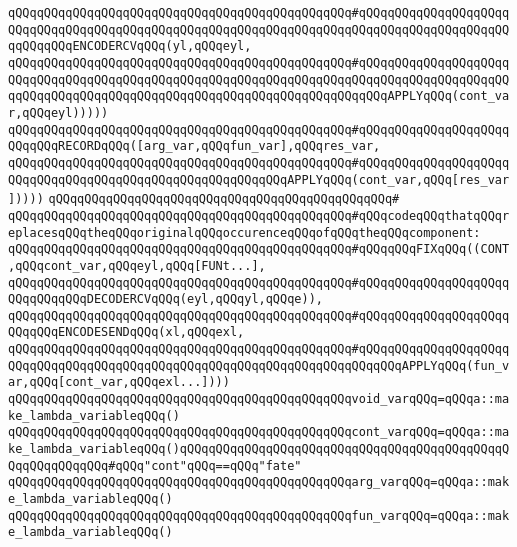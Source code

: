 \verb|qQQqqQQqqQQqqQQqqQQqqQQqqQQqqQQqqQQqqQQqqQQqqQQq#qQQqqQQqqQQqqQQqqQQqqQQqqQQqqQQqqQQqqQQqqQQqqQQqqQQqqQQqqQQqqQQqqQQqqQQqqQQqqQQqqQQqqQQqqQQqqQQqqQQqENCODERCVqQQq(yl,qQQqeyl,|\newline
\verb|qQQqqQQqqQQqqQQqqQQqqQQqqQQqqQQqqQQqqQQqqQQqqQQq#qQQqqQQqqQQqqQQqqQQqqQQqqQQqqQQqqQQqqQQqqQQqqQQqqQQqqQQqqQQqqQQqqQQqqQQqqQQqqQQqqQQqqQQqqQQqqQQqqQQqqQQqqQQqqQQqqQQqqQQqqQQqqQQqqQQqqQQqqQQqqQQqAPPLYqQQq(cont_var,qQQqeyl)))))|\newline
\verb|qQQqqQQqqQQqqQQqqQQqqQQqqQQqqQQqqQQqqQQqqQQqqQQq#qQQqqQQqqQQqqQQqqQQqqQQqqQQqRECORDqQQq([arg_var,qQQqfun_var],qQQqres_var,|\newline
\verb|qQQqqQQqqQQqqQQqqQQqqQQqqQQqqQQqqQQqqQQqqQQqqQQq#qQQqqQQqqQQqqQQqqQQqqQQqqQQqqQQqqQQqqQQqqQQqqQQqqQQqqQQqqQQqAPPLYqQQq(cont_var,qQQq[res_var]))))|\newline
\verb|qQQqqQQqqQQqqQQqqQQqqQQqqQQqqQQqqQQqqQQqqQQqqQQq#|\newline
\verb|qQQqqQQqqQQqqQQqqQQqqQQqqQQqqQQqqQQqqQQqqQQqqQQq#qQQqcodeqQQqthatqQQqreplacesqQQqtheqQQqoriginalqQQqoccurenceqQQqofqQQqtheqQQqcomponent:|\newline
\verb|qQQqqQQqqQQqqQQqqQQqqQQqqQQqqQQqqQQqqQQqqQQqqQQq#qQQqqQQqFIXqQQq((CONT,qQQqcont_var,qQQqeyl,qQQq[FUNt...],|\newline
\verb|qQQqqQQqqQQqqQQqqQQqqQQqqQQqqQQqqQQqqQQqqQQqqQQq#qQQqqQQqqQQqqQQqqQQqqQQqqQQqqQQqDECODERCVqQQq(eyl,qQQqyl,qQQqe)),|\newline
\verb|qQQqqQQqqQQqqQQqqQQqqQQqqQQqqQQqqQQqqQQqqQQqqQQq#qQQqqQQqqQQqqQQqqQQqqQQqqQQqENCODESENDqQQq(xl,qQQqexl,|\newline
\verb|qQQqqQQqqQQqqQQqqQQqqQQqqQQqqQQqqQQqqQQqqQQqqQQq#qQQqqQQqqQQqqQQqqQQqqQQqqQQqqQQqqQQqqQQqqQQqqQQqqQQqqQQqqQQqqQQqqQQqqQQqqQQqAPPLYqQQq(fun_var,qQQq[cont_var,qQQqexl...])))|\newline
\newline
\newline
\verb|qQQqqQQqqQQqqQQqqQQqqQQqqQQqqQQqqQQqqQQqqQQqqQQqvoid_varqQQq=qQQqa::make_lambda_variableqQQq()|\newline
\verb|qQQqqQQqqQQqqQQqqQQqqQQqqQQqqQQqqQQqqQQqqQQqqQQqcont_varqQQq=qQQqa::make_lambda_variableqQQq()qQQqqQQqqQQqqQQqqQQqqQQqqQQqqQQqqQQqqQQqqQQqqQQqqQQqqQQqqQQq#qQQq"cont"qQQq==qQQq"fate"|\newline
\verb|qQQqqQQqqQQqqQQqqQQqqQQqqQQqqQQqqQQqqQQqqQQqqQQqarg_varqQQq=qQQqa::make_lambda_variableqQQq()|\newline
\verb|qQQqqQQqqQQqqQQqqQQqqQQqqQQqqQQqqQQqqQQqqQQqqQQqfun_varqQQq=qQQqa::make_lambda_variableqQQq()|\newline
